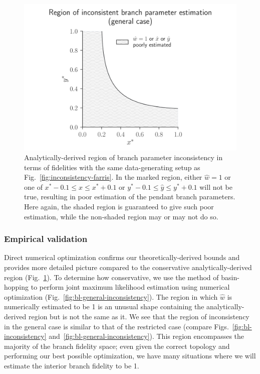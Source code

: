 \documentclass{article}
\begin{document}
\begin{figure}
\centering
\includegraphics[width=\textwidth]{bl-loose-inconsistency-inkscape}
\caption{
    Analytically-derived region of branch parameter inconsistency in terms of fidelities with the same data-generating setup as Fig.~\ref{fig:inconsistency-farris}.
    In the marked region, either $\hat{w}=1$ or one of $x^*-0.1 \le \hat{x} \le x^*+0.1$ or $y^*-0.1 \le \hat{y} \le y^*+0.1$ will not be true, resulting in poor estimation of the pendant branch parameters.
Here again, the shaded region is guaranteed to give such poor estimation, while the non-shaded region may or may not do so.
}
\label{fig:bl-loose-inconsistency}
\end{figure}

\subsubsection*{Empirical validation}

Direct numerical optimization confirms our theoretically-derived bounds and provides more detailed picture compared to the conservative analytically-derived region (Fig.~\ref{fig:bl-loose-inconsistency}).
To determine how conservative, we use the method of basin-hopping \cite{Wales1997} to perform joint maximum likelihood estimation using numerical optimization (Fig.~\ref{fig:bl-general-inconsistency}).
The region in which $\hat{w}$ is numerically estimated to be 1 is an unusual shape containing the analytically-derived region but is not the same as it.
We see that the region of inconsistency in the general case is similar to that of the restricted case (compare Figs.~\ref{fig:bl-inconsistency} and~\ref{fig:bl-general-inconsistency}).
This region encompasses the majority of the branch fidelity space; even given the correct topology and performing our best possible optimization, we have many situations where we will estimate the interior branch fidelity to be 1.
\end{document}
